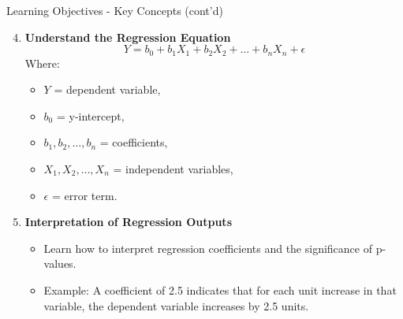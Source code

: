 \documentclass[aspectratio=169]{beamer}
\begin{document}
\begin{frame}[fragile]{Learning Objectives - Key Concepts (cont'd)}
    \begin{enumerate}
        \setcounter{enumi}{3} %
        \item \textbf{Understand the Regression Equation}
            \begin{equation}
            Y = b_0 + b_1X_1 + b_2X_2 + \ldots + b_nX_n + \epsilon
            \end{equation}
            Where:
            \begin{itemize}
                \item $Y$ = dependent variable,
                \item $b_0$ = y-intercept,
                \item $b_1, b_2, \ldots, b_n$ = coefficients,
                \item $X_1, X_2, \ldots, X_n$ = independent variables,
                \item $\epsilon$ = error term.
            \end{itemize}
        
        \item \textbf{Interpretation of Regression Outputs}
            \begin{itemize}
                \item Learn how to interpret regression coefficients and the significance of p-values.
                \item Example: A coefficient of 2.5 indicates that for each unit increase in that variable, the dependent variable increases by 2.5 units.
            \end{itemize}
    \end{enumerate}
\end{frame}
\end{document}
